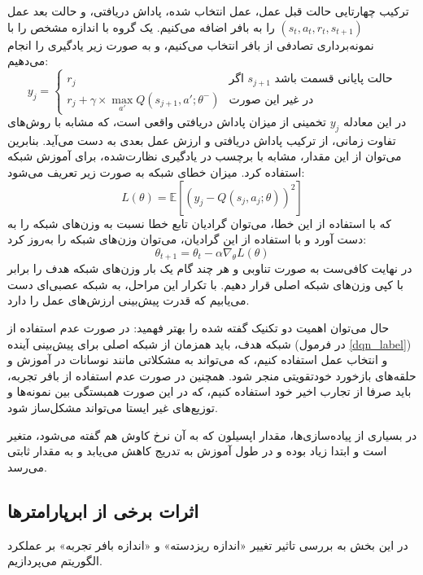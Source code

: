 ترکیب چهارتایی حالت قبل عمل، عمل انتخاب شده، پاداش دریافتی، و حالت بعد عمل $(s_t,a_t,r_t,s_{t+1})$
را به بافر اضافه می‌کنیم.
یک گروه با اندازه مشخص را با نمونه‌برداری تصادفی از بافر انتخاب می‌کنیم، و به صورت زیر یادگیری را انجام می‌دهیم:
\begin{equation}\label{dqn_label}
    y_j = \begin{cases}
        r_j & \text{اگر $s_{j+1}$ حالت پایانی قسمت باشد} \\
        r_j + \gamma \times \max_{a'} Q(s_{j+1}, a'; \theta^-) & \text{در غیر این صورت}
    \end{cases}
\end{equation}
در این معادله $y_j$ تخمینی از میزان پاداش دریافتی واقعی است، که مشابه با روش‌های تفاوت زمانی، از ترکیب پاداش دریافتی و ارزش عمل بعدی به دست می‌آید.
بنابرین می‌توان از این مقدار، مشابه با برچسب در یادگیری نظارت‌شده، برای آموزش شبکه استفاده کرد.
میزان خطای شبکه به صورت زیر تعریف می‌شود:
\begin{equation}\label{dqn_loss}
    L(\theta) = \mathbb{E}[(y_j - Q(s_j, a_j; \theta))^2]
\end{equation}
که با استفاده از این خطا، می‌توان گرادیان تابع خطا نسبت به وزن‌های شبکه را به دست آورد و
با استفاده از این گرادیان، می‌توان وزن‌های شبکه را به‌روز کرد:
\begin{equation}\label{dqn_update}
    \theta_{t+1} = \theta_t - \alpha \nabla_\theta L(\theta)
\end{equation}
در نهایت کافی‌ست به صورت تناوبی و هر چند گام یک بار وزن‌های شبکه هدف را برابر با کپی وزن‌های شبکه اصلی قرار دهیم. با تکرار این مراحل، به شبکه عصبی‌ای دست می‌یابیم که قدرت پیش‌بینی ارزش‌های عمل را دارد.


حال می‌توان اهمیت دو تکنیک گفته شده را بهتر فهمید: در صورت عدم استفاده از شبکه هدف، باید همزمان از شبکه اصلی برای پیش‌بینی آینده (در فرمول \ref{dqn_label}) و انتخاب عمل استفاده کنیم، که می‌تواند به مشکلاتی مانند نوسانات در آموزش و حلقه‌های بازخورد خودتقویتی منجر شود.
همچنین در صورت عدم استفاده از بافر تجربه، باید صرفا از تجارب اخیر خود استفاده کنیم، که در این صورت همبستگی بین نمونه‌ها و توزیع‌های غیر ایستا می‌تواند مشکل‌ساز شود.

در بسیاری از پیاده‌سازی‌ها، مقدار اپسیلون که به آن نرخ کاوش
 هم گفته می‌شود، متغیر است و ابتدا زیاد بوده و در طول آموزش به تدریج کاهش می‌یابد و به مقدار ثابتی می‌رسد.
\subsection{اثرات برخی از ابرپارامتر‌ها}
در این بخش به بررسی تاثیر تغییر «اندازه ریزدسته» و «اندازه بافر تجربه» بر عملکرد الگوریتم  می‌پردازیم.

